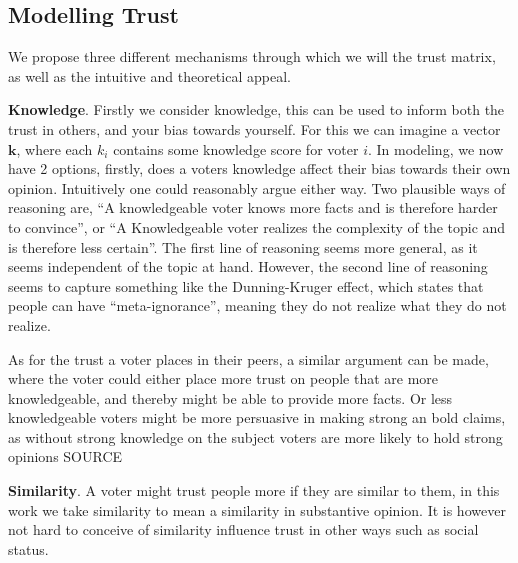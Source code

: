 \subsection{Modelling Trust} We propose three different mechanisms through which we
will the trust matrix, as well as the intuitive and theoretical
appeal.


\textbf{Knowledge}. Firstly we consider knowledge, this can be used to
inform both the trust in others, and your bias towards yourself. For this we
can imagine a vector $\boldsymbol{k}$, where each $k_i$ contains some knowledge
score for voter $i$. In modeling, we now have 2 options, firstly, does a voters
knowledge affect their bias towards their own opinion. Intuitively one could
reasonably argue either way. Two plausible ways of reasoning are, ``A
knowledgeable voter knows more facts and is therefore harder to convince'', or
``A Knowledgeable voter realizes the complexity of the topic and is therefore
less certain''. The first line of reasoning seems more general, as it seems
independent of the topic at hand. However, the second line of reasoning seems
to capture something like the Dunning-Kruger effect, which states that people
can have ``meta-ignorance'', meaning they do not realize what they do not realize.

As for the trust a voter places in their peers, a similar argument can be made,
where the voter could either place more trust on people that are more
knowledgeable, and thereby might be able to provide more facts. Or less
knowledgeable voters might be more persuasive in making strong an bold claims,
as without strong knowledge on the subject voters are more likely to hold
strong opinions SOURCE



\textbf{Similarity}. A voter might trust people more if they are similar to them, in this work we take similarity to mean a similarity in substantive opinion. It is however not hard to conceive of similarity influence trust in other ways such as social status.


